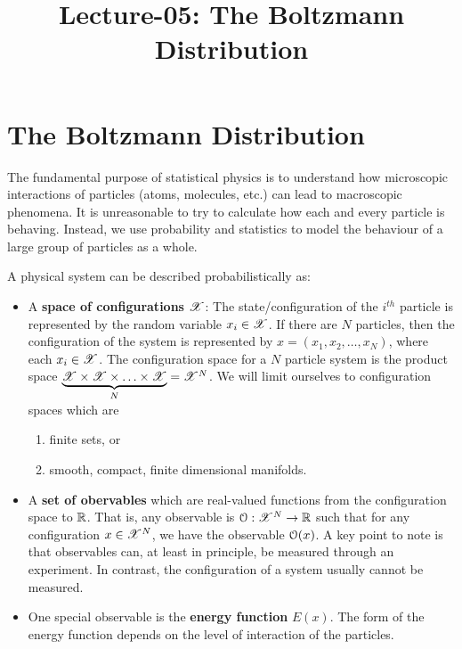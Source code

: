 \documentclass[letterpaper,english,10pt]{article}
\title{Lecture-05: The Boltzmann Distribution}%
\begin{document}
\maketitle
\section{The Boltzmann Distribution}
The fundamental purpose of statistical physics is to understand how microscopic interactions of particles (atoms, molecules, etc.) can lead to macroscopic phenomena. 
It is unreasonable to try to calculate how each and every particle is behaving. 
Instead, we use probability and statistics to model the behaviour of a large group of particles as a whole. 

A physical system can be described probabilistically as: 
\begin{itemize}
\item A \textbf{space of configurations $\mathscr{X}$}: The state/configuration of the $i^{th}$ particle is represented by the random variable $x_i \in \mathscr{X}$. If there are $N$ particles, then the configuration of the system is represented by $x=\left(x_1, x_2, \dots, x_N \right)$, where each $x_i \in \mathscr{X}$. The configuration space for a $N$ particle system is the product space 
$\underbrace{\mathscr{X} \times \mathscr{X} \times \ldots \times \mathscr{X} }_{N}={\mathscr{X}}^N$. 
We will limit ourselves to configuration spaces which are 
\begin{enumerate}[$(i)$]
\item finite sets, or 
\item smooth, compact, finite dimensional manifolds. 
\end{enumerate}
\item A \textbf{set of obervables} which are real-valued functions from the configuration space to $\mathbb{R}$. 
That is, any observable is $\mathcal{O}:{\mathscr{X}}^N \to \mathbb{R}$ such that for any configuration $x \in \mathscr{X}^N$, 
we have the observable $\mathcal{O}(x)$. 
A key point to note is that observables can, at least in principle, be measured through an experiment. In contrast, the configuration of a system usually cannot be measured. 
\item One special observable is the \textbf{energy function} $E(x)$. 
The form of the energy function depends on the level of interaction of the particles. 
\end{itemize}
\end{document}
